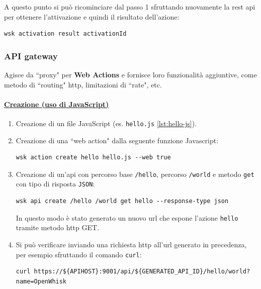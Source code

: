\documentclass[12pt,a4paper,openany,twoside]{book}
\begin{document}
\begin{enumerate}
    

    A questo punto si può ricominciare dal passo 1 sfruttando nuovamente la \ac{rest} \ac{api} per ottenere l'attivazione e quindi il risultato dell'azione:
    \begin{lstlisting}
wsk activation result activationId\end{lstlisting}
\end{enumerate}

\subsubsection{API gateway}

Agisce da ``proxy" per \textbf{Web Actions} e fornisce loro funzionalità aggiuntive, come metodo di ``routing" \ac{http}, limitazioni di ``rate", etc.

\paragraph{\underline{Creazione (uso di JavaScript)}}
\begin{enumerate}
    \item Creazione di un file JavaScript (es. \texttt{hello.js} \cref{lst:hello-js}).

    
    
    \item Creazione di una ``web action" dalla seguente funzione Javascript:
    \begin{lstlisting}
wsk action create hello hello.js --web true\end{lstlisting}

    \item Creazione di un'\ac{api} con percorso base \texttt{/hello}, percorso \texttt{/world} e metodo \texttt{get} con tipo di risposta \texttt{JSON}:
    \begin{lstlisting}
wsk api create /hello /world get hello --response-type json\end{lstlisting}

    In questo modo è stato generato un nuovo \ac{url} che espone l'azione \texttt{hello} tramite metodo \ac{http} GET.
    
    \item Si può verificare inviando una richiesta \ac{http} all'\ac{url} generato in precedenza, per esempio sfruttando il comando \texttt{curl}:
    \begin{lstlisting}
curl https://${APIHOST}:9001/api/${GENERATED_API_ID}/hello/world?name=OpenWhisk\end{lstlisting}
\end{enumerate}
\end{document}

